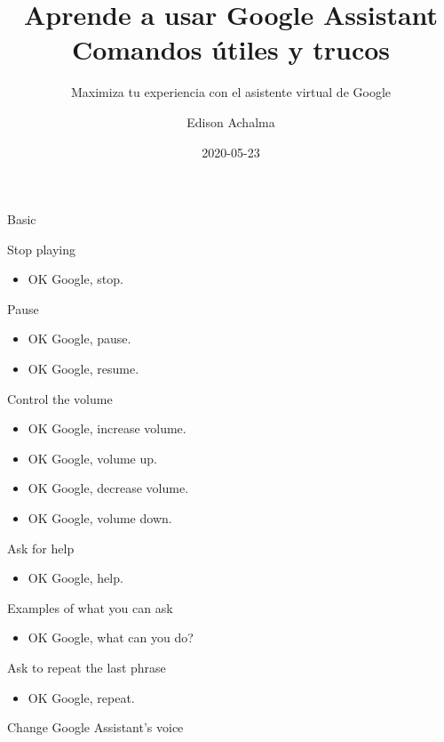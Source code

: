 \documentclass[
  a4paper,
]{article}
\title{Aprende a usar Google Assistant Comandos útiles y trucos}
\subtitle{Maximiza tu experiencia con el asistente virtual de Google}
\author{Edison Achalma}
\date{2020-05-23}
\providecommand{\tightlist}{%
  \setlength{\itemsep}{0pt}\setlength{\parskip}{0pt}}\usepackage{longtable,booktabs,array}
\begin{document}
\maketitle
\ifdefined\Shaded\renewenvironment{Shaded}{\begin{tcolorbox}[breakable, boxrule=0pt, sharp corners, interior hidden, borderline west={3pt}{0pt}{shadecolor}, frame hidden, enhanced]}{\end{tcolorbox}}\fi

Basic

Stop playing

\begin{itemize}
\tightlist
\item
  OK Google, stop.
\end{itemize}

Pause

\begin{itemize}
\tightlist
\item
  OK Google, pause.~
\item
  OK Google, resume.~
\end{itemize}

Control the volume

\begin{itemize}
\tightlist
\item
  OK Google, increase volume.~
\item
  OK Google, volume up.
\item
  OK Google, decrease volume.
\item
  OK Google, volume down.
\end{itemize}

Ask for help

\begin{itemize}
\tightlist
\item
  OK Google, help.
\end{itemize}

Examples of what you can ask

\begin{itemize}
\tightlist
\item
  OK Google, what can you do?
\end{itemize}

Ask to repeat the last phrase

\begin{itemize}
\tightlist
\item
  OK Google, repeat.
\end{itemize}

Change Google Assistant's voice
\end{document}
